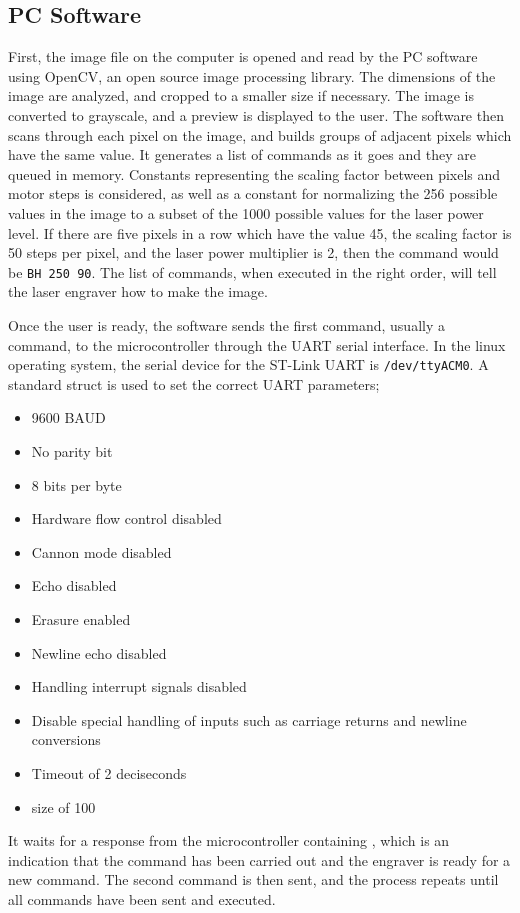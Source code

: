 \documentclass[11pt]{LaTeX-Classes/math-hw}
\begin{document}
\subsection{PC Software}
First, the image file on the computer is opened and read by the PC software using OpenCV, an open source
image processing library. The dimensions of the image are analyzed, and cropped to a smaller size
if necessary.
The image is converted to grayscale, and a preview is displayed to the user.
The software then scans through each pixel on the image, and builds groups of adjacent pixels
which have the same value. It generates a list of commands as it goes and they are queued in memory.
Constants representing the scaling factor between pixels and motor steps is considered, as well
as a constant for normalizing the 256 possible values in the image to a subset of the 1000 possible
values for the laser power level.
If there are five pixels in a row which have the value 45, the scaling factor is 50 steps
per pixel, and the laser power multiplier is 2, then the command would be \texttt{BH 250 90}.
The list of commands, when executed in the right order, will tell the laser engraver how to make the image.

Once the user is ready, the software sends the first command, usually a  command, to the
microcontroller through the UART serial interface.
In the linux operating system, the serial device for the ST-Link UART is \texttt{/dev/ttyACM0}.
A standard  struct is used to set the correct UART parameters;
\begin{itemize}
  \item 9600 BAUD
  \item No parity bit
  \item 8 bits per byte
  \item Hardware flow control disabled
  \item Cannon mode disabled
  \item Echo disabled
  \item Erasure enabled
  \item Newline echo disabled
  \item Handling interrupt signals disabled
  \item Disable special handling of inputs such as carriage returns and newline conversions
  \item Timeout of 2 deciseconds
  \item {} size of 100
\end{itemize}

It waits for a response from the microcontroller containing ,
which is an indication that the command has been
carried out and the engraver is ready for a new command.
The second command is then sent, and the process repeats until all commands have been sent and executed.
\end{document}
